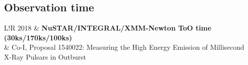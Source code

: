 \documentclass[10pt]{article}
\newcommand\VRule{\color{lightgray}\vrule width 0.5pt}
\begin{document}
%

\vspace{-8pt}
\subsection*{\phantom{sub} Observation time}
\begin{tabular}{L!{\VRule}R}
    2018 & \textbf{NuSTAR/INTEGRAL/XMM-Newton ToO time (30ks/170ks/100ks)} \\
         &  \small{Co-I, Proposal 1540022:} \footnotesize{Measuring the High Energy Emission of Millisecond X-Ray Pulsars in Outburst} \\[1ex]
\end{tabular}
\end{document}
